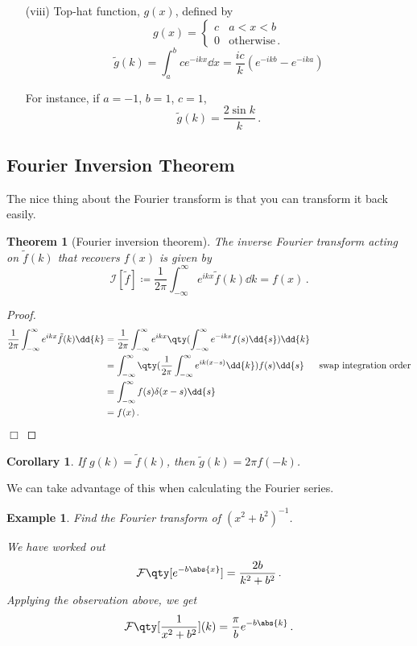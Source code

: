 \documentclass{article}
\theoremstyle{plain}\theoremheaderfont{\normalfont\itshape}\theorembodyfont{\rmfamily}\theoremseparator{.}\newtheorem*{rem}{Remark}\newtheorem*{ex}{Example}\newtheorem*{proof}{Proof}\newtheorem*{altp}{Alternative proof}
\theoremstyle{plain}\theoremheaderfont{\normalfont\bfseries}\theorembodyfont{\rmfamily}\theoremseparator{.}\newtheorem{thm}{Theorem}[section]\newtheorem{lem}[thm]{Lemma}\newtheorem{prop}[thm]{Proposition}\newtheorem*{cor}{Corollary}\newtheorem{defn}[thm]{Definition}\newtheorem{clm}[thm]{Claim}\newtheorem{clminproof}{Claim}
\theoremstyle{break}\theoremheaderfont{\normalfont\itshape}\theorembodyfont{\rmfamily}\theoremseparator{.\medskip}\newtheorem*{proofskip}{Proof}\newtheorem*{exs}{Examples}\newtheorem*{rems}{Remarks}
\theoremstyle{break}\theoremheaderfont{\normalfont\bfseries}\theorembodyfont{\rmfamily}\theoremseparator{.\medskip}\newtheorem{lemskip}[thm]{Lemma}\newtheorem{defnskip}[thm]{Definition}\newtheorem{propskip}[thm]{Proposition}\newtheorem{thmskip}[thm]{Theorem}
\numberwithin{equation}{section}
\newcommand{\qed}{\hfill\ensuremath{\Box}}
\begin{document}
\begin{itemize}
		If you think the proof above makes no sense, you absolutely are right. This result must be interpreted in the sense of a distribution, and is better proven using something called the Sokhotski--Plemelj identity in distribution theory. We are of course not doing this here.

		\begin{rem}
			\(ik\mathcal{F}[H(x-a)]=\mathcal{F}[\delta(x-a)]\).
		\end{rem}

		\item[(viii)] Top-hat function, \(g(x)\), defined by
		\[g(x)=\begin{cases}
			c & a<x<b\\
			0 & \text{otherwise}\,.
		\end{cases}\]
		\[\tilde{g}(k)=\int_{a}^{b}ce^{-ikx}\dd{x}=\frac{ic}{k}(e^{-ikb}-e^{-ika})\]
		
		For instance, if \(a=-1\), \(b=1\), \(c=1\),
		\[\tilde{g}(k)=\frac{2\sin k}{k}\,.\]
	\end{itemize}
	
	\subsection{Fourier Inversion Theorem}
	The nice thing about the Fourier transform is that you can transform it back easily.
	\begin{thm}[Fourier inversion theorem]
		The inverse Fourier transform acting on \(\tilde{f}(k)\) that recovers \(f(x)\) is given by
		\[\mathcal{I}[\tilde{f}]\coloneqq\frac{1}{2\pi}\int_{-\infty}^{\infty}e^{ikx}\tilde{f}(k)\dd{k}=f(x)\,.\]
	\end{thm}
	
	\begin{proof}
		\begin{align*}
			\frac{1}{2\pi}\int_{-\infty}^{\infty}e^{ikx}\tilde{f}(k)\dd{k}&=\frac{1}{2\pi}\int_{-\infty}^{\infty}e^{ikx}\qty(\int_{-\infty}^{\infty}e^{-iks}f(s)\dd{s})\dd{k}\\
			&=\int_{-\infty}^{\infty}\qty(\frac{1}{2\pi}\int_{-\infty}^{\infty}e^{ik(x-s)}\dd{k})f(s)\dd{s} & \text{swap integration order}\\
			&=\int_{-\infty}^{\infty}f(s)\delta(x-s)\dd{s}\\
			&=f(x)\,.
		\end{align*}\qed
	\end{proof}
	
	\begin{cor}
		If \(g(k)=\tilde{f}(k)\), then \(\tilde{g}(k)=2\pi f(-k)\).
	\end{cor}
	We can take advantage of this when calculating the Fourier series.
	\begin{ex}
		Find the Fourier transform of \((x^2+b^2)^{-1}\).

		We have worked out
		\[\mathcal{F}\qty[e^{-b\abs{x}}]=\frac{2b}{k^2+b^2}\,.\]
		Applying the observation above, we get
		\[\mathcal{F}\qty[\frac{1}{x^2+b^2}](k)=\frac{\pi}{b}e^{-b\abs{k}}\,.\]
	\end{ex}
	
\end{document}
